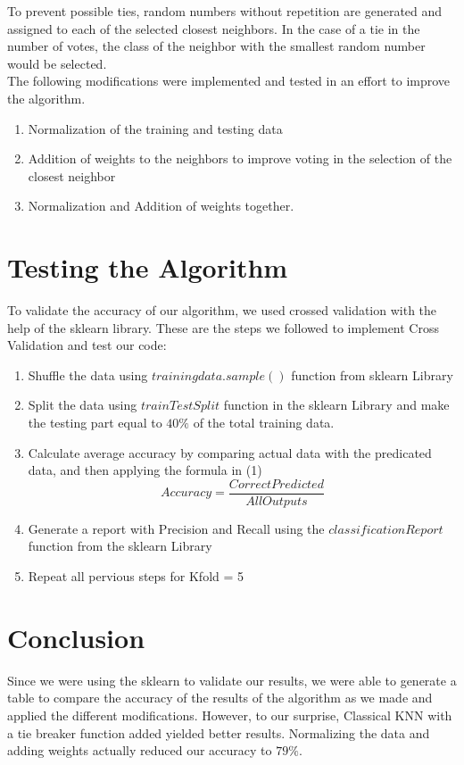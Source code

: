 \documentclass{article}
\begin{document}
To prevent possible ties, random numbers without repetition are generated and assigned to each of the selected closest neighbors. In the case of a tie in the number of votes, the class of the neighbor with the smallest random number would be selected. \\ The following modifications were implemented and tested in an effort to improve the algorithm.
\begin{enumerate}
\item Normalization of the training and testing data
\item Addition of weights to the neighbors to improve voting in the selection of the closest neighbor
\item Normalization and Addition of weights together.
\end{enumerate}

 \section{Testing the Algorithm}
To validate the accuracy of our algorithm, we used crossed validation with the help of the sklearn library. These are the steps we followed to implement Cross Validation and test our code:
 \begin{enumerate}
	\item Shuffle the data using  $ trainingdata.sample()$ function from sklearn Library 
	\item Split the data using $ trainTestSplit$ function in the sklearn Library and make the testing part equal to $40 \%$  of the total training data.
	\item Calculate average accuracy  by  comparing actual data with the predicated data, and then applying the formula in (1)
	\begin{equation}
	Accuracy = \frac{CorrectPredicted}{AllOutputs}
	\end{equation} 
	\item  Generate a report with Precision and Recall using the $classificationReport$ function from the sklearn Library
	\item Repeat all pervious steps for Kfold = 5
 \end{enumerate}
 
\section{Conclusion}
Since we were using the sklearn to validate our results, we were able to generate a table to compare the accuracy of the results of the algorithm as we made and applied the different modifications. However, to our surprise, Classical KNN with a tie breaker function added yielded better results. Normalizing the data and adding weights actually reduced our accuracy to $79\%$. 
 
\end{document}
